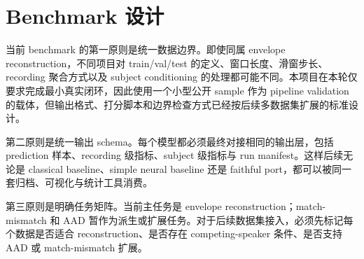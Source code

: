 \section{Benchmark 设计}

当前 benchmark 的第一原则是统一数据边界。即使同属 envelope reconstruction，不同项目对 train/val/test 的定义、窗口长度、滑窗步长、recording 聚合方式以及 subject conditioning 的处理都可能不同。本项目在本轮仅要求完成最小真实闭环，因此使用一个小型公开 sample 作为 pipeline validation 的载体，但输出格式、打分脚本和边界检查方式已经按后续多数据集扩展的标准设计。

第二原则是统一输出 schema。每个模型都必须最终对接相同的输出层，包括 prediction 样本、recording 级指标、subject 级指标与 run manifest。这样后续无论是 classical baseline、simple neural baseline 还是 faithful port，都可以被同一套归档、可视化与统计工具消费。

第三原则是明确任务矩阵。当前主任务是 envelope reconstruction；match-mismatch 和 AAD 暂作为派生或扩展任务。对于后续数据集接入，必须先标记每个数据是否适合 reconstruction、是否存在 competing-speaker 条件、是否支持 AAD 或 match-mismatch 扩展。




